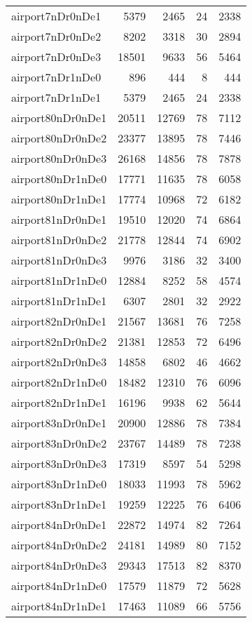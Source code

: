 \begin{longtable}{lrrrr}
airport7nDr0nDe1 & 5379 & 2465 & 24 & 2338 \\
airport7nDr0nDe2 & 8202 & 3318 & 30 & 2894 \\
airport7nDr0nDe3 & 18501 & 9633 & 56 & 5464 \\
airport7nDr1nDe0 & 896 & 444 & 8 & 444 \\
airport7nDr1nDe1 & 5379 & 2465 & 24 & 2338 \\
airport80nDr0nDe1 & 20511 & 12769 & 78 & 7112 \\
airport80nDr0nDe2 & 23377 & 13895 & 78 & 7446 \\
airport80nDr0nDe3 & 26168 & 14856 & 78 & 7878 \\
airport80nDr1nDe0 & 17771 & 11635 & 78 & 6058 \\
airport80nDr1nDe1 & 17774 & 10968 & 72 & 6182 \\
airport81nDr0nDe1 & 19510 & 12020 & 74 & 6864 \\
airport81nDr0nDe2 & 21778 & 12844 & 74 & 6902 \\
airport81nDr0nDe3 & 9976 & 3186 & 32 & 3400 \\
airport81nDr1nDe0 & 12884 & 8252 & 58 & 4574 \\
airport81nDr1nDe1 & 6307 & 2801 & 32 & 2922 \\
airport82nDr0nDe1 & 21567 & 13681 & 76 & 7258 \\
airport82nDr0nDe2 & 21381 & 12853 & 72 & 6496 \\
airport82nDr0nDe3 & 14858 & 6802 & 46 & 4662 \\
airport82nDr1nDe0 & 18482 & 12310 & 76 & 6096 \\
airport82nDr1nDe1 & 16196 & 9938 & 62 & 5644 \\
airport83nDr0nDe1 & 20900 & 12886 & 78 & 7384 \\
airport83nDr0nDe2 & 23767 & 14489 & 78 & 7238 \\
airport83nDr0nDe3 & 17319 & 8597 & 54 & 5298 \\
airport83nDr1nDe0 & 18033 & 11993 & 78 & 5962 \\
airport83nDr1nDe1 & 19259 & 12225 & 76 & 6406 \\
airport84nDr0nDe1 & 22872 & 14974 & 82 & 7264 \\
airport84nDr0nDe2 & 24181 & 14989 & 80 & 7152 \\
airport84nDr0nDe3 & 29343 & 17513 & 82 & 8370 \\
airport84nDr1nDe0 & 17579 & 11879 & 72 & 5628 \\
airport84nDr1nDe1 & 17463 & 11089 & 66 & 5756 \\

\end{longtable}
